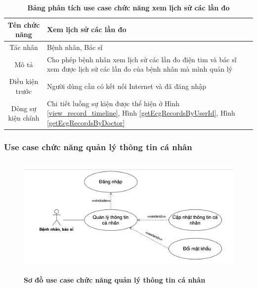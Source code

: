   \begin{table}[H]
    \caption{\bfseries \fontsize{12pt}{0pt}\selectfont Bảng phân tích use case chức năng xem lịch sử các lần đo}
    \centering
    \begin{tabularx}{0.9\textwidth}{|c|X|}
      \hline
      \textbf{Tên chức năng} & \textbf{Xem lịch sử các lần đo} \\
      \hline
      Tác nhân & Bệnh nhân, Bác sĩ \\
      \hline
      Mô tả & Cho phép bệnh nhân xem lịch sử các lần đo điện tim và bác sĩ xem được lịch sử các lần đo của bệnh nhân
      mà mình quản lý \\
      \hline
      Điều kiện trước & Người dùng cần có kết nối Internet và đã đăng nhập \\
      \hline
      Dòng sự kiện chính & 
        Chi tiết luồng sự kiện được thể hiện ở Hình \ref{view_record_timeline}, Hình \ref{getEcgRecordsByUserId}, Hình \ref{getEcgRecordsByDoctor} 
        \\
      \hline
    \end{tabularx}
  \end{table}

\subsubsection{Use case chức năng quản lý thông tin cá nhân}
  \begin{figure}[H]
    \centering
    \includegraphics[width=15cm,height=6cm]{Images/use_case/use_case_manage_info.png}
    \caption[Sơ đồ use case chức năng quản lý thông tin cá nhân]{\bfseries \fontsize{12pt}{0pt}
    \selectfont Sơ đồ use case chức năng quản lý thông tin cá nhân}
    \label{use_case_manage_info} %
  \end{figure}

